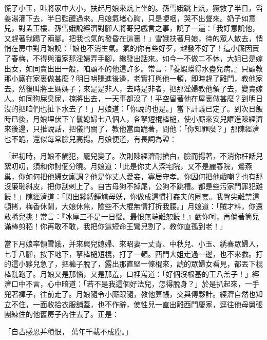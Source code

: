 \begin{showcontents}{}
慌了小玉，叫將家中大小，扶起月娘來炕上坐的。孫雪娥跳上炕，獗救了半日，舀姜湯灌下去，半日甦醒過來。月娘氣堵心胸，只是哽咽，哭不出聲來。奶子如意兒，對孟玉樓、孫雪娥說經濟對腳人將哥兒戲言之事，說了一遍：「我好意說他，又趕著我踢了兩腳。把我也氣的發昏在這裏！」雪娥扶著月娘，待的眾人散去，悄悄在房中對月娘說：「娘也不消生氣。氣的你有些好歹，越發不好了！這小廝因賣了春梅，不得與潘家那淫婦弄手腳，纔發出話來。如今一不做二不休，大姐已是嫁出女，如同賣出田一般，咱顧不的他這許多。常言：『養蝦蟆得水蠱兒病。』只顧教那小廝在家裏做甚麼？明日哄賺進後邊，老實打與他一頓，即時趕了離門，教他家去。然後叫將王媽媽子；來是是非人，去時是非者，把那淫婦教他領了去，變賣嫁人。如同狗屎臭尿，掠將出去，一天事都沒了！平空留著他在屋裏做甚麼？到明日沒的把咱們也扯下水去了！」月娘道：「你說的也是。」當下計議已定了。到次日飯時已後，月娘埋伏下丫鬟媳婦七八個人，各拏短棍棒槌，使小廝來安兒誆進陳經濟來後邊，只推說話，把儀門關了，教他當面跪著，問他：「你知罪麼？」那陳經濟也不跪，還似每常臉兒高揚。月娘便道，有長詞為證：

「起初時，月娘不觸犯，龐兒變了。次則陳經濟耐搶白，臉而揚著，不消你枉話兒絮叨叨，須和你討個分曉。月娘道：「此是你丈人深宅院，又不是麗春院，鶯燕巢，你如何把他婦女廝調？他是你丈人愛妾，寡居守孝。你因何把他戲嘲？也有那沒廉恥斜皮，把你刮剌上了。自古母狗不掉尾，公狗不跳槽。都是些污家門罪犯難饒！」陳經濟道：「閃出夥縛鍾馗母妖，你做成這慣打姦夫的圈套。我臀尖難禁這頓拷，梅香休鬧，大娘休焦，險些不大棍無情打折我腰。」月娘道：「賊才料，你還敢嘴兒挑！常言：『冰厚三不是一日惱。最恨無端難恕饒！』虧你呵，再倘著筒兒滿棒剪稻！你再敢不敢，我把你這短命王鸞兒割了，教你直孤到老！」

當下月娘率領雪娥，并來興兒媳婦、來昭妻一丈青、中秋兒、小玉、綉春眾婦人，七手八腳，按下地下，拏棒槌短棍，打了一頓。西門大姐走過一邊，也不來救。打的這小夥兒急了，把褲子脫了，露出那直堅一條棍來，諕的眾婦女看見，都丟下棍棒亂跑了。月娘又是那惱，又是那羞，口裡罵道：「好個沒根基的王八羔子！」經濟口中不言，心中暗道：「若不是我這個好法兒，怎得脫身？」於是扒起來，一手兜著褲子，往前走了。月娘隨令小廝跟隨，教他算帳，交與傅夥計。經濟自然也知立不住，一面收拾衣服舖蓋，也不作辭，使性兒一直出離西門慶家，逕往他母舅張團練住的他舊房子內住去了。正是：

「自古感恩并積恨，  萬年千載不成塵。」


\end{showcontents}
